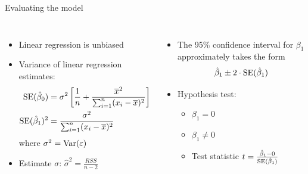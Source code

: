 \documentclass[aspectratio=169,usenames,dvipsnames]{beamer}
\begin{document}
\begin{frame}[c]{Evaluating the model}

\begin{columns}
\centering
\begin{itemize}
	\item Linear regression is unbiased
	\item Variance of linear regression estimates:
	\begin{align*}
		\mathrm{SE}(\hat \beta_0)
				&= \sigma^2 \left[ \frac{1}{n} + \frac{\overline x^2}{\sum_{i=1}^n (x_i - \overline x)^2}\right]\\
		\mathrm{SE}(\hat \beta_1)^2 &= \frac{\sigma^2}{\sum_{i=1}^n (x_i - \overline x)^2}
	\end{align*}
	where $\sigma^2 = \mathrm{Var}(\varepsilon)$
	\item Estimate $\sigma$:
	$\hat \sigma^2 = \frac{RSS}{n-2}$
\end{itemize}

\centering
\begin{itemize}
	\item The 95\% confidence interval for $\beta_1$ approximately takes the form
	\begin{equation*}
		\hat \beta_1 \pm 2 \cdot \mathrm{SE}(\hat \beta_1)
	\end{equation*}
	\item Hypothesis test:
	\begin{itemize}
			\item [ $H_0$:] $\beta_1 = 0$
			\item [$H_a$:] $\beta_1 \neq 0$
			\item Test statistic $	t = \frac{\hat \beta_1 - 0}{\mathrm{SE}(\hat \beta_1)}$
		\end{itemize}
\end{itemize}
\end{columns}

\end{frame}
\end{document}
